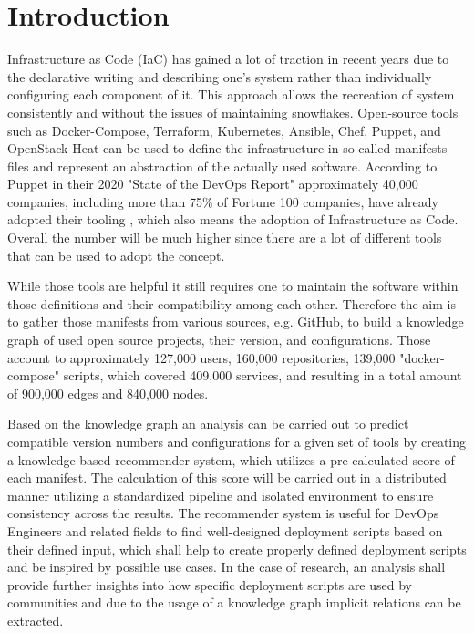 \chapter{Introduction}
Infrastructure as Code (IaC) has gained a lot of traction in recent years due to the declarative writing and describing one's system rather than individually configuring each component of it. This approach allows the recreation of system consistently and without the issues of maintaining snowflakes. Open-source tools such as Docker-Compose, Terraform, Kubernetes, Ansible, Chef, Puppet, and OpenStack Heat can be used to define the infrastructure in so-called manifests files and represent an abstraction of the actually used software. According to Puppet in their 2020 "State of the DevOps Report" approximately 40,000 companies, including more than 75\% of Fortune 100 companies, have already adopted their tooling \cite{puppet}, which also means the adoption of Infrastructure as Code. Overall the number will be much higher since there are a lot of different tools that can be used to adopt the concept.

While those tools are helpful it still requires one to maintain the software within those definitions and their compatibility among each other.
Therefore the aim is to gather those manifests from various sources, e.g. GitHub, to build a knowledge graph of used open source projects, their version, and configurations. Those account to approximately 127,000 users, 160,000 repositories, 139,000 "docker-compose" scripts, which covered 409,000 services, and resulting in a total amount of 900,000 edges and 840,000 nodes.

Based on the knowledge graph an analysis can be carried out to predict compatible version numbers and configurations for a given set of tools by creating a knowledge-based recommender system, which utilizes a pre-calculated score of each manifest. The calculation of this score will be carried out in a distributed manner utilizing a standardized pipeline and isolated environment to ensure consistency across the results.
The recommender system is useful for DevOps Engineers and related fields to find well-designed deployment scripts based on their defined input, which shall help to create properly defined deployment scripts and be inspired by possible use cases. In the case of research, an analysis shall provide further insights into how specific deployment scripts are used by communities and due to the usage of a knowledge graph implicit relations can be extracted.

